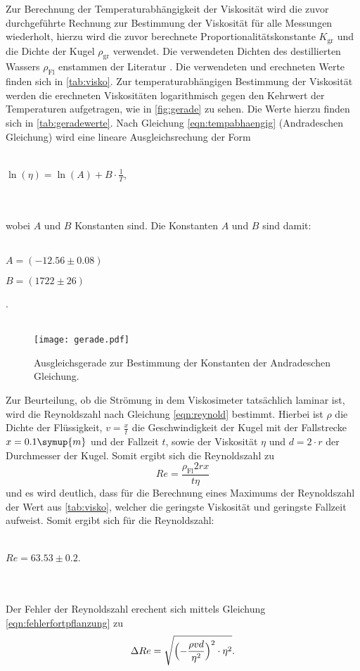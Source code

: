 Zur Berechnung der Temperaturabhängigkeit der Viskosität wird die zuvor durchgeführte Rechnung zur Bestimmung der Viskosität für
alle Messungen wiederholt, hierzu wird die zuvor berechnete Proportionalitätskonstante $K_\text{gr}$ und die Dichte der Kugel $\rho_\text{gr}$ verwendet. Die verwendeten Dichten 
des destillierten Wassers $\rho_\text{Fl}$ enstammen der Literatur \cite{science}.
Die verwendeten und erechneten Werte finden sich in \autoref{tab:visko}.
Zur temperaturabhängigen Bestimmung der Viskosität werden die erechneten Viskositäten logarithmisch gegen den Kehrwert der Temperaturen aufgetragen, wie in \autoref{fig:gerade} zu sehen.
Die Werte hierzu finden sich in \autoref{tab:geradewerte}. Nach Gleichung \eqref{eqn:tempabhaengig} (Andradeschen Gleichung) wird eine lineare Ausgleichsrechung der Form
\\ \\
\centerline{$\ln(\eta) = \ln(A) + B \cdot \frac{1}{T}$,}
\\ \\
wobei $A$ und $B$ Konstanten sind.
Die Konstanten $A$ und $B$ sind damit:
\\ \\
\centerline{$A = (-12.56 \pm 0.08)$}
\centerline{$B = (1722 \pm 26 )$}.
\\ \\


\begin{figure}
  \centering
  \texttt{[image: gerade.pdf]}
  \caption{Ausgleichsgerade zur Bestimmung der Konstanten der Andradeschen Gleichung.}
  \label{fig:gerade}
\end{figure}
Zur Beurteilung, ob die Strömung in dem Viskosimeter tatsächlich laminar ist, wird die Reynoldszahl nach Gleichung \eqref{eqn:reynold} bestimmt.
Hierbei ist $\rho$ die Dichte der Flüssigkeit, $v= \frac{x}{t}$ die Geschwindigkeit der Kugel mit der Fallstrecke $x=0.1 \symup{m}$ und der Fallzeit $t$, sowie der 
Viskosität $\eta$ und $d = 2\cdot r$ der Durchmesser der Kugel. Somit ergibt sich die Reynoldszahl zu 
\begin{equation}
Re = \frac{\rho_\text{Fl} 2r x}{t \eta}
\end{equation}
und es wird deutlich, dass für die Berechnung eines Maximums der Reynoldszahl der Wert aus \autoref{tab:visko}, welcher die geringste Viskosität und geringste Fallzeit aufweist.
Somit ergibt sich für die Reynoldszahl:
\\ \\
\centerline{$ Re = 63.53 \pm 0.2$.}
\\ \\
Der Fehler der Reynoldszahl erechent sich mittels Gleichung \eqref{eqn:fehlerfortpflanzung} zu
\begin{equation}
\Delta Re = \sqrt{\Bigl(- \frac{\rho v d}{\eta^2}\Bigr)^2 \cdot \eta^2}.
\end{equation}
